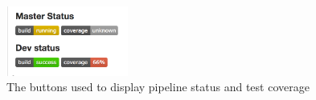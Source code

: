 \begin{figure}[H]
\begin{center}
\includegraphics[width=4cm]{figures/cicd_coverage_buttons}
\end{center}
\caption{The buttons used to display pipeline status and test coverage}
\label{fig:cicd_coverage_buttons}
\end{figure}
